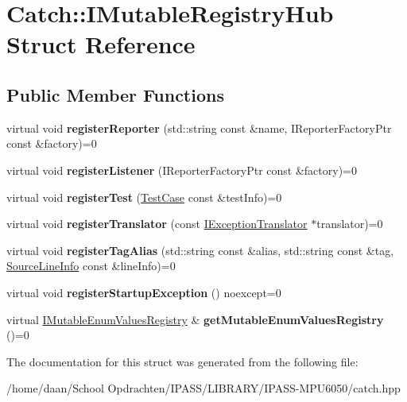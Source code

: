 \hypertarget{structCatch_1_1IMutableRegistryHub}{}\section{Catch\+:\+:I\+Mutable\+Registry\+Hub Struct Reference}
\label{structCatch_1_1IMutableRegistryHub}
\subsection*{Public Member Functions}
\begin{DoxyCompactItemize}
\item 
\mbox{\label{structCatch_1_1IMutableRegistryHub_a1c0ac202ac31ee9f88e8ff5cbac4b243}} 
virtual void {\bfseries register\+Reporter} (std\+::string const \&name, I\+Reporter\+Factory\+Ptr const \&factory)=0
\item 
\mbox{\label{structCatch_1_1IMutableRegistryHub_abd892a133f85581fd00ee75bb379ca56}} 
virtual void {\bfseries register\+Listener} (I\+Reporter\+Factory\+Ptr const \&factory)=0
\item 
\mbox{\label{structCatch_1_1IMutableRegistryHub_a11b85c6744d88c9f83fe16ad4a8dd451}} 
virtual void {\bfseries register\+Test} (\hyperlink{classCatch_1_1TestCase}{Test\+Case} const \&test\+Info)=0
\item 
\mbox{\label{structCatch_1_1IMutableRegistryHub_ae6825365102693cf7707db022a2c2b49}} 
virtual void {\bfseries register\+Translator} (const \hyperlink{structCatch_1_1IExceptionTranslator}{I\+Exception\+Translator} $\ast$translator)=0
\item 
\mbox{\label{structCatch_1_1IMutableRegistryHub_abf2e386b6f94f615719ada711adbf822}} 
virtual void {\bfseries register\+Tag\+Alias} (std\+::string const \&alias, std\+::string const \&tag, \hyperlink{structCatch_1_1SourceLineInfo}{Source\+Line\+Info} const \&line\+Info)=0
\item 
\mbox{\label{structCatch_1_1IMutableRegistryHub_a72a7d5386851ac3200f8da794a009c86}} 
virtual void {\bfseries register\+Startup\+Exception} () noexcept=0
\item 
\mbox{\label{structCatch_1_1IMutableRegistryHub_ab91c4fd63eeb0efd9bfb270e8bbd231d}} 
virtual \hyperlink{structCatch_1_1IMutableEnumValuesRegistry}{I\+Mutable\+Enum\+Values\+Registry} \& {\bfseries get\+Mutable\+Enum\+Values\+Registry} ()=0
\end{DoxyCompactItemize}


The documentation for this struct was generated from the following file\+:\begin{DoxyCompactItemize}
\item 
/home/daan/\+School Opdrachten/\+I\+P\+A\+S\+S/\+L\+I\+B\+R\+A\+R\+Y/\+I\+P\+A\+S\+S-\/\+M\+P\+U6050/catch.\+hpp\end{DoxyCompactItemize}
